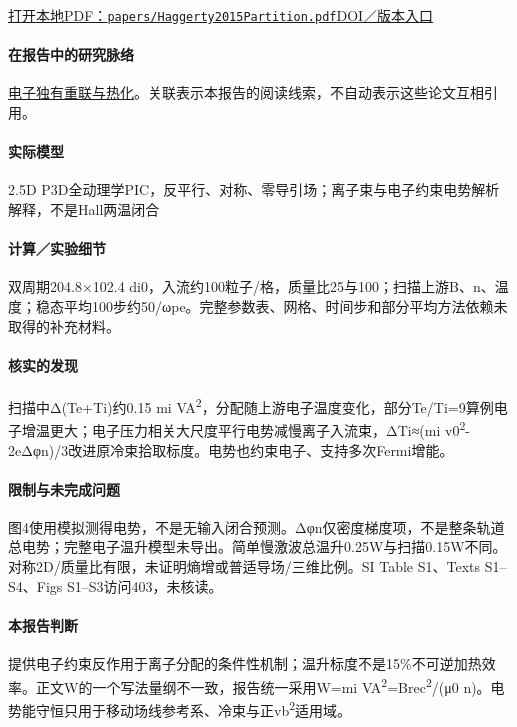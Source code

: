 \documentclass[UTF8,a4paper,11pt,openany,fontset=fandol]{ctexbook}
\begin{document}
\href{run:../papers/Haggerty2015Partition.pdf}{打开本地PDF：\texttt{papers/Haggerty2015Partition.pdf}}\quad\href{https://doi.org/10.1002/2015GL065961}{DOI／版本入口}

\paragraph{在报告中的研究脉络}\hyperref[story:energy]{电子独有重联与热化}。关联表示本报告的阅读线索，不自动表示这些论文互相引用。

\paragraph{实际模型}2.5D P3D全动理学PIC，反平行、对称、零导引场；离子束与电子约束电势解析解释，不是Hall两温闭合

\paragraph{计算／实验细节}双周期204.8×102.4 di0，入流约100粒子/格，质量比25与100；扫描上游B、n、温度；稳态平均100步约50/ωpe。完整参数表、网格、时间步和部分平均方法依赖未取得的补充材料。

\paragraph{核实的发现}扫描中Δ(Te+Ti)约0.15 mi VA\textsuperscript{2}，分配随上游电子温度变化，部分Te/Ti=9算例电子增温更大；电子压力相关大尺度平行电势减慢离子入流束，ΔTi≈(mi v0\textsuperscript{2}-2eΔφn)/3改进原冷束拾取标度。电势也约束电子、支持多次Fermi增能。

\paragraph{限制与未完成问题}图4使用模拟测得电势，不是无输入闭合预测。Δφn仅密度梯度项，不是整条轨道总电势；完整电子温升模型未导出。简单慢激波总温升0.25W与扫描0.15W不同。对称2D/质量比有限，未证明熵增或普适导场/三维比例。SI Table S1、Texts S1–S4、Figs S1–S3访问403，未核读。

\paragraph{本报告判断}提供电子约束反作用于离子分配的条件性机制；温升标度不是15\%不可逆加热效率。正文W的一个写法量纲不一致，报告统一采用W=mi VA\textsuperscript{2}=Brec\textsuperscript{2}/(μ0 n)。电势能守恒只用于移动场线参考系、冷束与正vb\textsuperscript{2}适用域。
\end{document}
